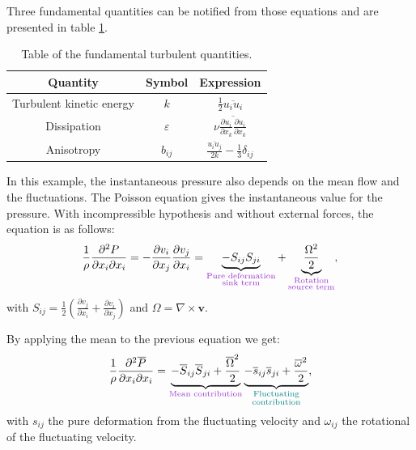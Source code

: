 Three fundamental quantities can be notified from those equations and are presented in table \ref{tab:turbqte}.
\begin{table}[!ht]
\begin{center}
   \begin{tabular}{ c  c  c }
     \toprule
     Quantity & Symbol & Expression \\
     \midrule
     \rowcolor[gray]{0.9} Turbulent kinetic energy & $k$ & $\frac{1}{2}\overline{u_iu_i}$  \\ 
     Dissipation & $\varepsilon$ &  $\nu\overline{\frac{\partial u_i}{\partial x_k}\frac{\partial u_i}{\partial x_k}}$ \\ 
     \rowcolor[gray]{0.9} Anisotropy & $b_{ij}$ &  $\frac{\overline{u_iu_j}}{2k}-\frac{1}{3}\delta_{ij}$\\ 
     \bottomrule
   \end{tabular}
 \end{center}
\caption{Table of the fundamental turbulent quantities.}
\label{tab:turbqte}
\end{table}
In this example, the instantaneous pressure also depends on the mean flow and the fluctuations. The Poisson equation gives the instantaneous value for the pressure. With incompressible hypothesis and without external forces, the equation is as follows: 
\begin{equation}
\frac{1}{\rho}\frac{\partial^2 P}{\partial x_i\partial x_i}=-\frac{\partial v_i}{\partial x_j}\frac{\partial v_j}{\partial x_i}=\underbrace{-S_{ij}S_{ji}}_{\color{mydarkorchid}\substack{\text{Pure deformation}\\\text{sink term}}} + \underbrace{\frac{\Omega^2}{2}}_{\color{mydarkorchid}\substack{\text{Rotation}\\\text{source term}}},
\end{equation}
with $S_{ij}=\frac{1}{2}(\frac{\partial v_j}{\partial x_i}+\frac{\partial v_i}{\partial x_j})$ and $\Omega=\nabla \times \mathbf{v}$.

By applying the mean to the previous equation we get:
\begin{equation}
\frac{1}{\rho}\frac{\partial^2 \overline{P}}{\partial x_i\partial x_i} = \underbrace{-\overline{S}_{ij}\overline{S}_{ji}+\frac{\overline{\Omega}^2}{2}}_{\color{mydarkorchid}\text{Mean contribution}}\underbrace{-\overline{s}_{ij}\overline{s}_{ji}+\frac{\overline{\omega}^2}{2}}_{\color{myteal}\substack{\text{Fluctuating}\\\text{contribution}}},
\end{equation}
with $s_{ij}$ the pure deformation from the fluctuating velocity and $\omega_{ij}$ the rotational of the fluctuating velocity.

